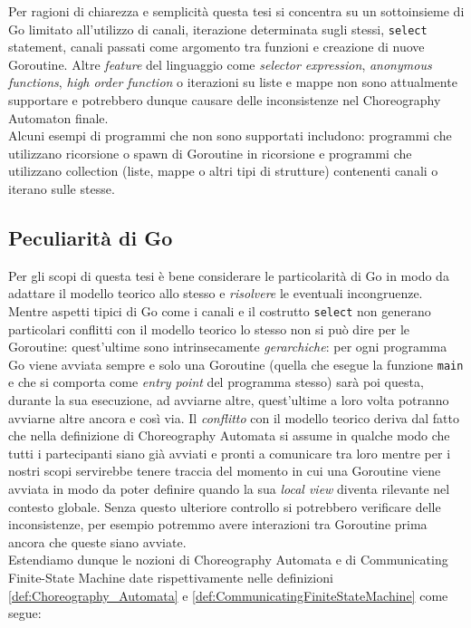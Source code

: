 Per ragioni di chiarezza e semplicità questa tesi si concentra su un sottoinsieme di Go limitato all'utilizzo di canali, iterazione determinata sugli stessi, \texttt{select} statement, canali passati come argomento tra funzioni e creazione di nuove Goroutine. Altre \emph{feature} del linguaggio come \emph{selector expression}, \emph{anonymous functions}, \emph{high order function} o iterazioni su liste e mappe non sono attualmente supportare e potrebbero dunque causare delle inconsistenze nel Choreography Automaton finale. \\
Alcuni esempi di programmi che non sono supportati includono: programmi che utilizzano ricorsione o spawn di Goroutine in ricorsione e programmi che utilizzano collection (liste, mappe o altri tipi di strutture) contenenti canali o iterano sulle stesse. \\

\subsection{Peculiarità di Go}
Per gli scopi di questa tesi è bene considerare le particolarità di Go in modo da adattare il modello teorico allo stesso e \emph{risolvere} le eventuali incongruenze.\bigskip \\
Mentre aspetti tipici di Go come i canali e il costrutto \texttt{select} non generano particolari conflitti con il modello teorico lo stesso non si può dire per le Goroutine: quest'ultime sono intrinsecamente \emph{gerarchiche}: per ogni programma Go viene avviata sempre e solo una Goroutine (quella che esegue la funzione \texttt{main} e che si comporta come \emph{entry point} del programma stesso) sarà poi questa, durante la sua esecuzione, ad avviarne altre, quest'ultime a loro volta potranno avviarne altre ancora e così via.
Il \emph{conflitto} con il modello teorico deriva dal fatto che nella definizione di Choreography Automata si assume in qualche modo che tutti i partecipanti siano già avviati e pronti a comunicare tra loro mentre per i nostri scopi servirebbe tenere traccia del momento in cui una Goroutine viene avviata in modo da poter definire quando la sua \emph{local view} diventa rilevante nel contesto globale. Senza questo ulteriore controllo si potrebbero verificare delle inconsistenze, per esempio potremmo avere interazioni tra Goroutine prima ancora che queste siano avviate.\bigskip \\
Estendiamo dunque le nozioni di Choreography Automata e di Communicating Finite-State Machine date rispettivamente nelle definizioni \ref{def:Choreography_Automata} e \ref{def:CommunicatingFiniteStateMachine} come segue:

